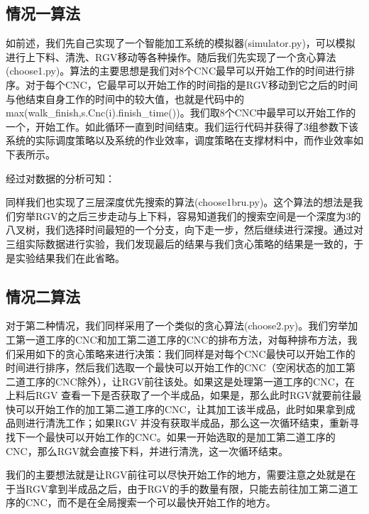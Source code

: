 \documentclass{cumcmthesis}
\begin{document}
\subsection{情况一算法}

如前述，我们先自己实现了一个智能加工系统的模拟器(simulator.py)，可以模拟进行上下料、清洗、RGV移动等各种操作。随后我们先实现了一个贪心算法(choose1.py)。算法的主要思想是我们对8个CNC最早可以开始工作的时间进行排序。对于每个CNC，它最早可以开始工作的时间指的是RGV移动到它之后的时间与他结束自身工作的时间中的较大值，也就是代码中的 max(walk\_finish,s.Cnc(i).finish\_time())。我们取8个CNC中最早可以开始工作的一个，开始工作。如此循环一直到时间结束。我们运行代码并获得了3组参数下该系统的实际调度策略以及系统的作业效率，调度策略在支撑材料中，而作业效率如下表所示。

经过对数据的分析可知：{\color{red}{还有啥}}

同样我们也实现了三层深度优先搜索的算法(choose1bru.py)。这个算法的想法是我们穷举RGV的之后三步走动与上下料，容易知道我们的搜索空间是一个深度为3的八叉树，我们选择时间最短的一个分支，向下走一步，然后继续进行深搜。通过对三组实际数据进行实验，我们发现最后的结果与我们贪心策略的结果是一致的，于是实验结果我们在此省略。


\subsection{情况二算法}

对于第二种情况，我们同样采用了一个类似的贪心算法(choose2.py)。我们穷举加工第一道工序的CNC和加工第二道工序的CNC的排布方法，对每种排布方法，我们采用如下的贪心策略来进行决策：我们同样是对每个CNC最快可以开始工作的时间进行排序，然后我们选取一个最快可以开始工作的CNC（空闲状态的加工第二道工序的CNC除外），让RGV前往该处。如果这是处理第一道工序的CNC，在上料后RGV 查看一下是否获取了一个半成品，如果是，那么此时RGV就要前往最快可以开始工作的加工第二道工序的CNC，让其加工该半成品，此时如果拿到成品则进行清洗工作；如果RGV 并没有获取半成品，那么这一次循环结束，重新寻找下一个最快可以开始工作的CNC。如果一开始选取的是加工第二道工序的CNC，那么RGV就会直接下料，并进行清洗，这一次循环结束。

我们的主要想法就是让RGV前往可以尽快开始工作的地方，需要注意之处就是在于当RGV拿到半成品之后，由于RGV的手的数量有限，只能去前往加工第二道工序的CNC，而不是在全局搜索一个可以最快开始工作的地方。
\end{document}
